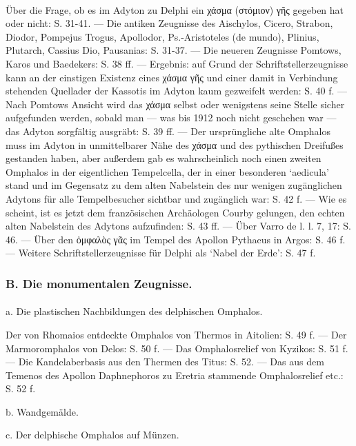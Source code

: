 \documentclass[a4paper, 11pt, oneside]{article}
\begin{document}
\paragraph{}
Über die Frage, ob es im Adyton zu Delphi ein χάσμα (στόμιον) γῆς gegeben hat oder nicht: S. 31-41. --- Die antiken Zeugnisse des Aischylos, Cicero, Strabon, Diodor, Pompejus Trogus, Apollodor, Ps.-Aristoteles (de mundo), Plinius, Plutarch, Cassius Dio, Pausanias: S. 31-37. --- Die neueren Zeugnisse Pomtows, Karos und Baedekers: S. 38 ff. --- Ergebnis: auf Grund der Schriftstellerzeugnisse kann an der einstigen Existenz eines χάσμα γῆς und einer damit in Verbindung stehenden Quellader der Kassotis im Adyton kaum gezweifelt werden: S. 40 f. --- Nach Pomtows Ansicht wird das χάσμα selbst oder wenigstens seine Stelle sicher aufgefunden werden, sobald man --- was bis 1912 noch nicht geschehen war --- das Adyton sorgfältig ausgräbt: S. 39 ff. --- Der ursprüngliche alte Omphalos muss im Adyton in unmittelbarer Nähe des χάσμα und des pythischen Dreifußes gestanden haben, aber außerdem gab es wahrscheinlich noch einen zweiten Omphalos in der eigentlichen Tempelcella, der in einer besonderen `aedicula' stand und im Gegensatz zu dem alten Nabelstein des nur wenigen zugänglichen Adytons für alle Tempelbesucher sichtbar und zugänglich war: S. 42 f. --- Wie es scheint, ist es jetzt dem französischen Archäologen Courby gelungen, den echten alten Nabelstein des Adytons aufzufinden: S. 43 ff. --- Über Varro de l. l. 7, 17: S. 46. --- Über den ὀμφαλὸς γᾶς im Tempel des Apollon Pythaeus in Argos: S. 46 f. --- Weitere Schriftstellerzeugnisse für Delphi als `Nabel der Erde': S. 47 f.

\subsubsection*{B. Die monumentalen Zeugnisse.}
\paragraph{}
a. Die plastischen Nachbildungen des delphischen Omphalos.

Der von Rhomaios entdeckte Omphalos von Thermos in Aitolien: S. 49 f. --- Der Marmoromphalos von Delos: S. 50 f. --- Das Omphalosrelief von Kyzikos: S. 51 f. --- Die Kandelaberbasis aus den Thermen des Titus: S. 52. --- Das aus dem Temenos des Apollon Daphnephoros zu Eretria stammende Omphalosrelief etc.: S. 52 f.

b. Wandgemälde.

c. Der delphische Omphalos auf Münzen.
\end{document}
